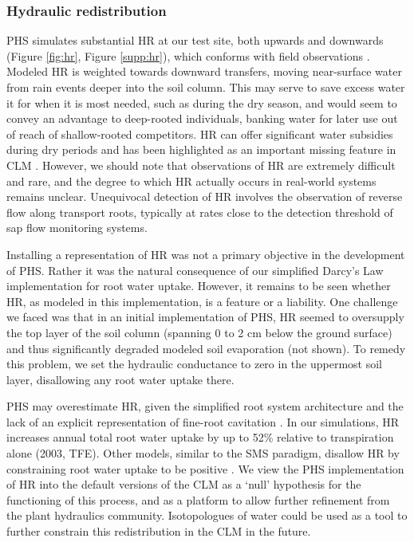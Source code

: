 \documentclass[draft,linenumbers]{agujournal}
\begin{document}
\subsubsection{Hydraulic redistribution}
\label{sect:hr}
PHS simulates substantial HR at our test site, both upwards and downwards (Figure \ref{fig:hr}, Figure \ref{supp:hr}), which conforms with field observations \citep{burgess1998,oliveira2005}.
    Modeled HR is weighted towards downward transfers, moving near-surface water from rain events deeper into the soil column. 
    This may serve to save excess water it for when it is most needed, such as during the dry season, 
    and would seem to convey an advantage to deep-rooted individuals, banking water for later use out of reach of shallow-rooted competitors.
    HR can offer significant water subsidies during dry periods \citep{jackson2000} and has been highlighted as an important missing feature in CLM \citep{lee2005,tang2015}. 
    However, we should note that observations of HR are extremely difficult and rare, and the degree to which HR actually occurs in real-world systems remains unclear. 
    Unequivocal detection of HR involves the observation of reverse flow along transport roots, typically at rates close to the detection threshold of sap flow monitoring systems. 
    
    Installing a representation of HR was not a primary objective in the development of PHS.
    Rather it was the natural consequence of our simplified Darcy's Law implementation for root water uptake.
    However, it remains to be seen whether HR, as modeled in this implementation, is a feature or a liability.
    One challenge we faced was that in an initial implementation of PHS, HR seemed to oversupply the top layer of the soil column (spanning 0 to 2 cm below the ground surface) and thus significantly degraded modeled soil evaporation (not shown). 
    To remedy this problem, we set the hydraulic conductance to zero in the uppermost soil layer, disallowing any root water uptake there.
    
    PHS may overestimate HR, given the simplified root system architecture \citep{bouda2017} 
    and the lack of an explicit representation of fine-root cavitation \citep{kotowska2015}.
    In our simulations, HR increases annual total root water uptake by up to 52\% relative to transpiration alone (2003, TFE). 
    Other models, similar to the SMS paradigm, disallow HR by constraining root water uptake to be positive \citep{xu2016}.
    We view the PHS implementation of HR into the default versions of the CLM as a `null' hypothesis for the functioning of this process, and as a platform to allow further refinement from the plant hydraulics community. 
    Isotopologues of water could be used as a tool to further constrain this redistribution in the CLM in the future. 
    
\end{document}
